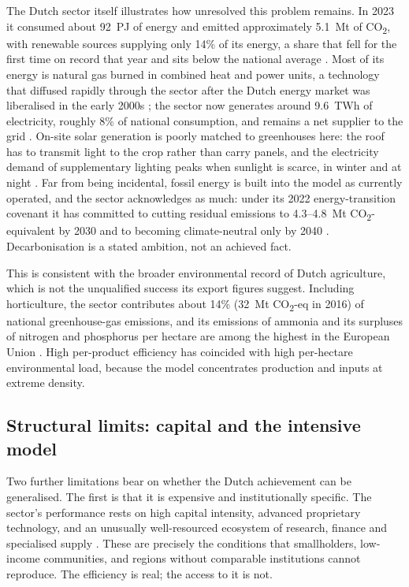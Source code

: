The Dutch sector itself illustrates how unresolved this problem remains. In 2023 it consumed about 92~PJ of energy and emitted approximately 5.1~Mt of CO\textsubscript{2}, with renewable sources supplying only 14\% of its energy, a share that fell for the first time on record that year and sits below the national average \cite[Summary; Sec.~2.5.2]{smit2024energiemonitor}. Most of its energy is natural gas burned in combined heat and power units, a technology that diffused rapidly through the sector after the Dutch energy market was liberalised in the early 2000s \cite[pp.~8--9]{vanderveen2015chp}; the sector now generates around 9.6~TWh of electricity, roughly 8\% of national consumption, and remains a net supplier to the grid \cite[Sec.~4.3]{smit2024energiemonitor}. On-site solar generation is poorly matched to greenhouses here: the roof has to transmit light to the crop rather than carry panels, and the electricity demand of supplementary lighting peaks when sunlight is scarce, in winter and at night \cite[Sec.~3.2.2]{smit2024energiemonitor}. Far from being incidental, fossil energy is built into the model as currently operated, and the sector acknowledges as much: under its 2022 energy-transition covenant it has committed to cutting residual emissions to 4.3--4.8~Mt CO\textsubscript{2}-equivalent by 2030 and to becoming climate-neutral only by 2040 \cite[Art.~1]{convenant2022glastuinbouw}. Decarbonisation is a stated ambition, not an achieved fact.

This is consistent with the broader environmental record of Dutch agriculture, which is not the unqualified success its export figures suggest. Including horticulture, the sector contributes about 14\% (32~Mt CO\textsubscript{2}-eq in 2016) of national greenhouse-gas emissions, and its emissions of ammonia and its surpluses of nitrogen and phosphorus per hectare are among the highest in the European Union \cite[Abstract]{vangrinsven2019dutch}. High per-product efficiency has coincided with high per-hectare environmental load, because the model concentrates production and inputs at extreme density.

\subsection{Structural limits: capital and the intensive model}

Two further limitations bear on whether the Dutch achievement can be generalised. The first is that it is expensive and institutionally specific. The sector's performance rests on high capital intensity, advanced proprietary technology, and an unusually well-resourced ecosystem of research, finance and specialised supply \cite[p.~2]{vangrinsven2019dutch}. These are precisely the conditions that smallholders, low-income communities, and regions without comparable institutions cannot reproduce. The efficiency is real; the access to it is not.

